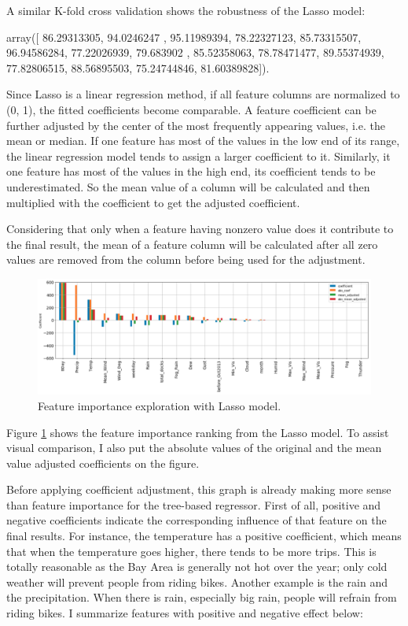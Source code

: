 \documentclass[a4paper]{article}
\begin{document}
			A similar K-fold cross validation shows the robustness of the Lasso model:
			
			array([ 86.29313305,  94.0246247 ,  95.11989394,  78.22327123,
					85.73315507,  96.94586284,  77.22026939,  79.683902  ,
					85.52358063,  78.78471477,  89.55374939,  77.82806515,
					88.56895503,  75.24744846,  81.60389828]).
			
			Since Lasso is a linear regression method, if all feature columns are normalized to (0, 1), the fitted coefficients become comparable. A feature coefficient can be further adjusted by the center of the most frequently appearing values, i.e. the mean or median. If one feature has most of the values in the low end of its range, the linear regression model tends to assign a larger coefficient to it. Similarly, it one feature has most of the values in the high end, its coefficient tends to be underestimated. So the mean value of a column will be calculated and then multiplied with the coefficient to get the adjusted coefficient.
			
			Considering that only when a feature having nonzero value does it contribute to the final result, the mean of a feature column will be calculated after all zero values are removed from the column before being used for the adjustment. 
			
			\begin{figure}
				\centering
				\includegraphics[width=1\textwidth]{LassoImportance.png}				\caption{\label{fig:lasso_importance}Feature importance exploration with Lasso model.}	
			\end{figure}	
			
			Figure \ref{fig:lasso_importance} shows the feature importance ranking from the Lasso model. To assist visual comparison, I also put the absolute values of the original and the mean value adjusted coefficients on the figure. 
			
			Before applying coefficient adjustment, this graph is already making more sense than feature importance for the tree-based regressor. First of all, positive and negative coefficients indicate the corresponding influence of that feature on the final results. For instance, the temperature has a positive coefficient, which means that when the temperature goes higher, there tends to be more trips. This is totally reasonable as the Bay Area is generally not hot over the year; only cold weather will prevent people from riding bikes. Another example is the rain and the precipitation. When there is rain, especially big rain, people will refrain from riding bikes. I summarize features with positive and negative effect below:
			
\end{document}
